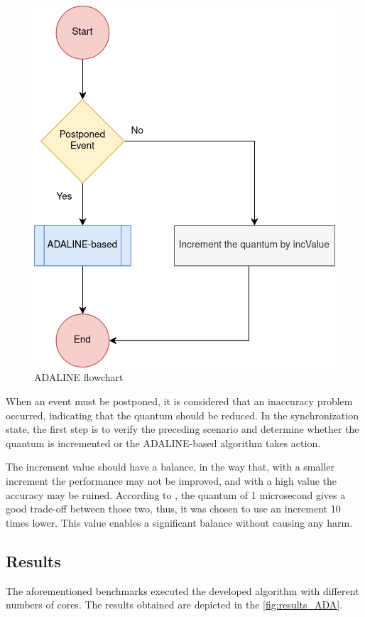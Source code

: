 \begin{figure}[H]
 	\includegraphics[width=0.32\linewidth]{Images/ADALINE_v1.png}
 	\caption{ADALINE flowchart}
	 \label{fig_ADALINE_v1}
\end{figure}

When an event must be postponed, it is considered that an inaccuracy problem occurred, indicating that the quantum should be reduced. In 
the synchronization state, the first step is to verify the preceding scenario and determine whether the quantum is incremented or the 
ADALINE-based algorithm takes action.

The increment value should have a balance, in the way that, with a smaller increment the performance may not be improved, and 
with a high value the accuracy may be ruined. According to \cite{pargem5}, the quantum of 1 microsecond gives a good trade-off between those 
two, thus, it was chosen to use an increment 10 times lower. This value enables a significant balance without causing any harm.

\subsection{Results}
\label{sec:ADALINE_results}

The aforementioned benchmarks executed the developed algorithm with different numbers of cores. The results obtained are depicted in the 
\autoref{fig:results_ADA}. 

